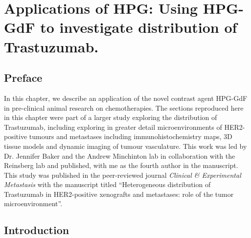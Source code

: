 

\chapter{Applications of HPG: Using \acs{HPG-GdF} to investigate distribution of Trastuzumab.}
\label{ch:HPG2}

\section{Preface}

In this chapter, we describe an application of the novel contrast agent \acs{HPG-GdF} in pre-clinical animal research on chemotherapies.
The sections reproduced here in this chapter were part of a larger study exploring the distribution of Trastuzumab, including exploring in greater detail microenvironments of \acs{HER2}-positive tumours and metastases including immunohistochemistry maps, 3D tissue models and dynamic imaging of tumour vasculature.
This work was led by Dr. Jennifer Baker and the Andrew Minchinton lab in collaboration with the Reinsberg lab and published, with me as the fourth author in the manuscript.
This study was published in the peer-reviewed journal \emph{Clinical \& Experimental Metastasis} with the manuscript titled ``Heterogeneous distribution of Trastuzumab in \acs{HER2}-positive xenografts and metastases: role of the tumor microenvironment''.

\section{Introduction}

